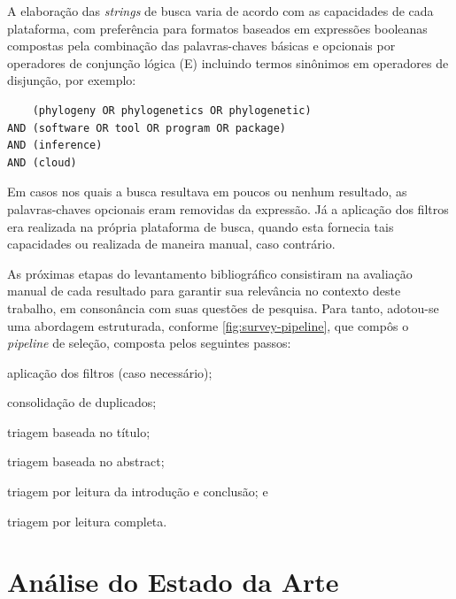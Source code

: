 \documentclass[english,brazilian]{UNISINOSmonografia} %
\begin{document}
A elaboração das \textit{strings} de busca varia de acordo com as capacidades de cada plataforma, com preferência para formatos baseados em expressões booleanas compostas pela combinação das palavras-chaves básicas e opcionais por operadores de conjunção lógica (E) incluindo termos sinônimos em operadores de disjunção, por exemplo:
\begin{verbatim}
    (phylogeny OR phylogenetics OR phylogenetic) 
AND (software OR tool OR program OR package) 
AND (inference) 
AND (cloud)
\end{verbatim}
Em casos nos quais a busca resultava em poucos ou nenhum resultado, as palavras-chaves opcionais eram removidas da expressão.
Já a aplicação dos filtros era realizada na própria plataforma de busca, quando esta fornecia tais capacidades ou realizada de maneira manual, caso contrário.


%


As próximas etapas do levantamento bibliográfico consistiram na avaliação manual de cada resultado para garantir sua relevância no contexto deste trabalho, em consonância com suas questões de pesquisa.
Para tanto, adotou-se uma abordagem estruturada, conforme \autoref{fig:survey-pipeline}, que compôs o \textit{pipeline} de seleção, composta pelos seguintes passos:
\begin{inparaenum}[I)]
	\item aplicação dos filtros (caso necessário);
	\item consolidação de duplicados;
	\item triagem baseada no título;
	\item triagem baseada no abstract;
	\item triagem por leitura da introdução e conclusão; e 
	\item triagem por leitura completa.
\end{inparaenum}




\section{Análise do Estado da Arte}
\label{sec:analise-estadodaarte}
\end{document}
